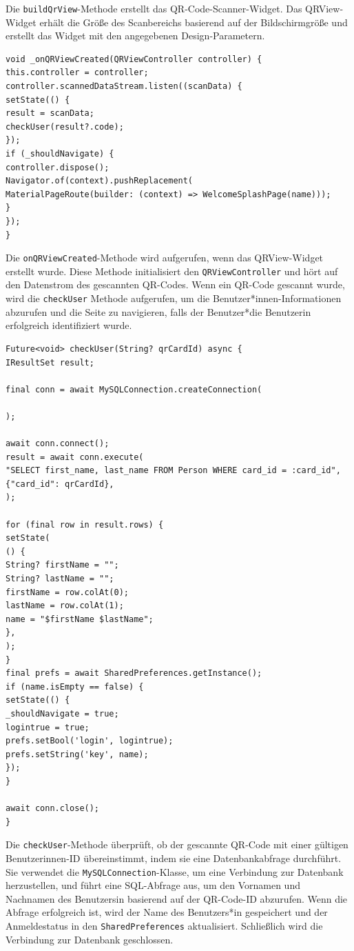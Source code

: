 Die \texttt{buildQrView}-Methode erstellt das QR-Code-Scanner-Widget. Das QRView-Widget erhält die Größe des Scanbereichs basierend auf der Bildschirmgröße und erstellt das Widget mit den angegebenen Design-Parametern.

\begin{lstlisting}[caption=QR-Code-Scanner Controller,label=lst:impl:frontend:qrcode]
void _onQRViewCreated(QRViewController controller) {
this.controller = controller;
controller.scannedDataStream.listen((scanData) {
setState(() {
result = scanData;
checkUser(result?.code);
});
if (_shouldNavigate) {
controller.dispose();
Navigator.of(context).pushReplacement(
MaterialPageRoute(builder: (context) => WelcomeSplashPage(name)));
}
});
}
\end{lstlisting}

Die \texttt{onQRViewCreated}-Methode wird aufgerufen, wenn das QRView-Widget erstellt wurde. Diese Methode initialisiert den \texttt{QRViewController} und hört auf den Datenstrom des gescannten QR-Codes. Wenn ein QR-Code gescannt wurde, wird die \texttt{checkUser} Methode aufgerufen, um die Benutzer*innen-Informationen abzurufen und die Seite zu navigieren, falls der Benutzer*die Benutzerin erfolgreich identifiziert wurde.

\begin{lstlisting}[caption=Datenbankabfrage QR-Code,label=lst:impl:frontend:qrcode]
Future<void> checkUser(String? qrCardId) async {
IResultSet result;

final conn = await MySQLConnection.createConnection(

);

await conn.connect();
result = await conn.execute(
"SELECT first_name, last_name FROM Person WHERE card_id = :card_id",
{"card_id": qrCardId},
);

for (final row in result.rows) {
setState(
() {
String? firstName = "";
String? lastName = "";
firstName = row.colAt(0);
lastName = row.colAt(1);
name = "$firstName $lastName";
},
);
}
final prefs = await SharedPreferences.getInstance();
if (name.isEmpty == false) {
setState(() {
_shouldNavigate = true;
logintrue = true;
prefs.setBool('login', logintrue);
prefs.setString('key', name);
});
}

await conn.close();
}
\end{lstlisting}

Die \texttt{checkUser}-Methode überprüft, ob der gescannte QR-Code mit einer gültigen Benutzerinnen-ID übereinstimmt, indem sie eine Datenbankabfrage durchführt. Sie verwendet die \texttt{MySQLConnection}-Klasse, um eine Verbindung zur Datenbank herzustellen, und führt eine SQL-Abfrage aus, um den Vornamen und Nachnamen des Benutzersin basierend auf der QR-Code-ID abzurufen. Wenn die Abfrage erfolgreich ist, wird der Name des Benutzers*in gespeichert und der Anmeldestatus in den \texttt{SharedPreferences} aktualisiert. Schließlich wird die Verbindung zur Datenbank geschlossen.

